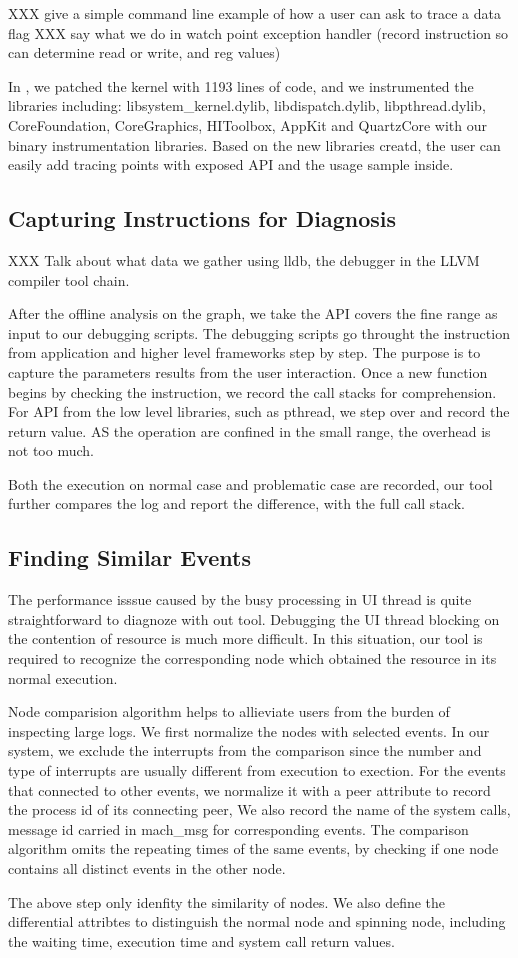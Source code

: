 XXX give a simple command line example of how a user can ask \xxx to trace a data flag
XXX say what we do in watch point exception handler (record instruction so can determine read or write, and reg values)

In \xxx, we patched the kernel with 1193 lines of code,
and we instrumented the libraries including: libsystem\_kernel.dylib, libdispatch.dylib, libpthread.dylib, CoreFoundation, CoreGraphics, HIToolbox, AppKit and QuartzCore with our binary instrumentation libraries. 
Based on the new libraries creatd, the user can easily add tracing points with exposed API and the usage sample inside.

\subsection{Capturing Instructions for Diagnosis}

XXX Talk about what data we gather using lldb, the debugger in the LLVM compiler tool chain.

After the offline analysis on the graph, we take the API covers the fine range as input to our debugging scripts.
The debugging scripts go throught the instruction from application and higher level frameworks step by step.
The purpose is to capture the parameters results from the user interaction.
Once a new function begins by checking the instruction, we record the call stacks for comprehension. 
For API from the low level libraries, such as pthread, we step over and record the return value.
AS the operation are confined in the small range, the overhead is not too much.

Both the execution on normal case and problematic case are recorded, our tool further compares the log and report
the difference, with the full call stack.

\subsection{Finding Similar Events}

The performance isssue caused by the busy processing in UI thread is quite straightforward to diagnoze with out tool.
Debugging the UI thread blocking on the contention of resource is much more difficult.
In this situation, our tool is required to recognize the corresponding node
which obtained the resource in its normal execution.

Node comparision algorithm helps to allieviate users from the burden of inspecting large logs.
We first normalize the nodes with selected events.
In our system, we exclude the interrupts from the comparison
since the number and type of interrupts are usually different from execution to exection.
For the events that connected to other events, we normalize it with a peer attribute
to record the process id of its connecting peer,
We also record the name of the system calls, message id carried in mach\_msg for corresponding events.
The comparison algorithm omits the repeating times of the same events,
by checking if one node contains all distinct events in the other node.

The above step only idenfity the similarity of nodes.
We also define the differential attribtes to distinguish the normal node and spinning node,
including the waiting time, execution time and system call return values.

